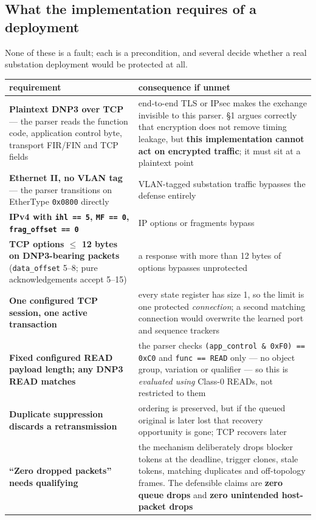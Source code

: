 \documentclass[10pt,a4paper,oneside]{article}
\newcommand{\code}[1]{\texttt{\small #1}}
\begin{document}
\subsection{What the implementation requires of a deployment}

None of these is a fault; each is a precondition, and several decide whether a real
substation deployment would be protected at all.

\begin{center}\small
\begin{tabular}{@{}>{\raggedright\arraybackslash}p{}>{\raggedright\arraybackslash}p{}@{}}
\toprule
\textbf{requirement} & \textbf{consequence if unmet} \\
\midrule
\textbf{Plaintext DNP3 over TCP} --- the parser reads the function code, application control
byte, transport FIR/FIN and TCP fields
& end-to-end TLS or IPsec makes the exchange invisible to this parser. \S1 argues correctly
that encryption does not remove timing leakage, but \textbf{this implementation cannot act
on encrypted traffic}; it must sit at a plaintext point \\
\textbf{Ethernet II, no VLAN tag} --- the parser transitions on EtherType \code{0x0800}
directly & VLAN-tagged substation traffic bypasses the defense entirely \\
\textbf{IPv4 with \code{ihl == 5}, \code{MF == 0}, \code{frag\_offset == 0}}
& IP options or fragments bypass \\
\textbf{TCP options $\le$ 12 bytes on DNP3-bearing packets} (\code{data\_offset} 5--8; pure
acknowledgements accept 5--15) & a response with more than 12 bytes of options bypasses
unprotected \\
\textbf{One configured TCP session, one active transaction} & every state register has size
1, so the limit is one protected \emph{connection}; a second matching connection would
overwrite the learned port and sequence trackers \\
\textbf{Fixed configured READ payload length; any DNP3 READ matches} & the parser checks
\code{(app\_control \& 0xF0) == 0xC0} and \code{func == READ} only --- no object group,
variation or qualifier --- so this is \emph{evaluated using} Class-0 READs, not restricted
to them \\
\textbf{Duplicate suppression discards a retransmission} & ordering is preserved, but if the
queued original is later lost that recovery opportunity is gone; TCP recovers later \\
\textbf{``Zero dropped packets'' needs qualifying} & the mechanism deliberately drops blocker
tokens at the deadline, trigger clones, stale tokens, matching duplicates and off-topology
frames. The defensible claims are \textbf{zero queue drops} and \textbf{zero unintended
host-packet drops} \\
\bottomrule
\end{tabular}
\end{center}
\end{document}
